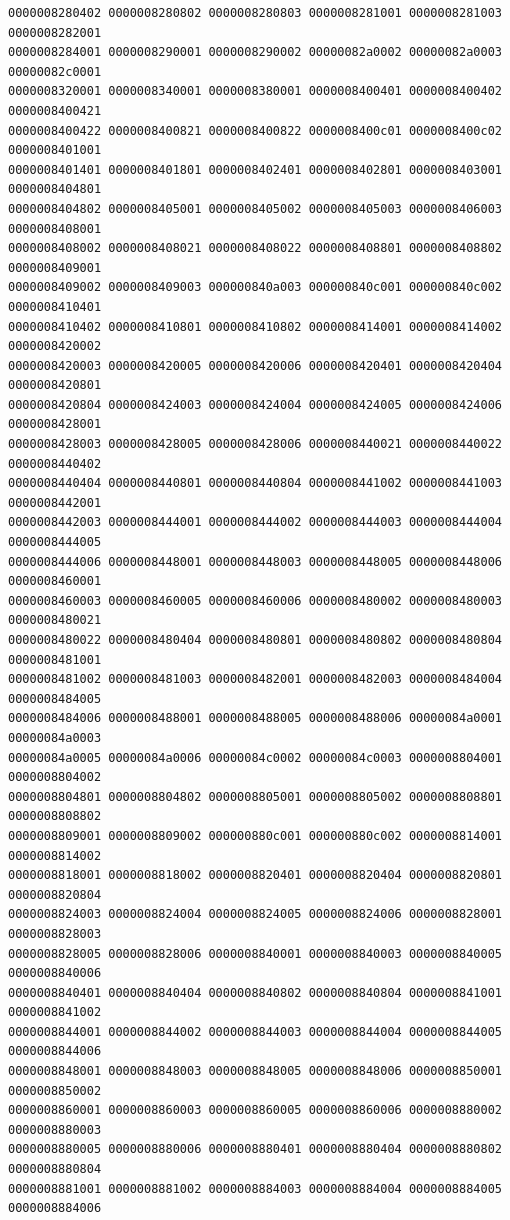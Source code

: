 \begin{Verbatim}[fontsize=\scriptsize]
0000008280402 0000008280802 0000008280803 0000008281001 0000008281003 0000008282001
0000008284001 0000008290001 0000008290002 00000082a0002 00000082a0003 00000082c0001
0000008320001 0000008340001 0000008380001 0000008400401 0000008400402 0000008400421
0000008400422 0000008400821 0000008400822 0000008400c01 0000008400c02 0000008401001
0000008401401 0000008401801 0000008402401 0000008402801 0000008403001 0000008404801
0000008404802 0000008405001 0000008405002 0000008405003 0000008406003 0000008408001
0000008408002 0000008408021 0000008408022 0000008408801 0000008408802 0000008409001
0000008409002 0000008409003 000000840a003 000000840c001 000000840c002 0000008410401
0000008410402 0000008410801 0000008410802 0000008414001 0000008414002 0000008420002
0000008420003 0000008420005 0000008420006 0000008420401 0000008420404 0000008420801
0000008420804 0000008424003 0000008424004 0000008424005 0000008424006 0000008428001
0000008428003 0000008428005 0000008428006 0000008440021 0000008440022 0000008440402
0000008440404 0000008440801 0000008440804 0000008441002 0000008441003 0000008442001
0000008442003 0000008444001 0000008444002 0000008444003 0000008444004 0000008444005
0000008444006 0000008448001 0000008448003 0000008448005 0000008448006 0000008460001
0000008460003 0000008460005 0000008460006 0000008480002 0000008480003 0000008480021
0000008480022 0000008480404 0000008480801 0000008480802 0000008480804 0000008481001
0000008481002 0000008481003 0000008482001 0000008482003 0000008484004 0000008484005
0000008484006 0000008488001 0000008488005 0000008488006 00000084a0001 00000084a0003
00000084a0005 00000084a0006 00000084c0002 00000084c0003 0000008804001 0000008804002
0000008804801 0000008804802 0000008805001 0000008805002 0000008808801 0000008808802
0000008809001 0000008809002 000000880c001 000000880c002 0000008814001 0000008814002
0000008818001 0000008818002 0000008820401 0000008820404 0000008820801 0000008820804
0000008824003 0000008824004 0000008824005 0000008824006 0000008828001 0000008828003
0000008828005 0000008828006 0000008840001 0000008840003 0000008840005 0000008840006
0000008840401 0000008840404 0000008840802 0000008840804 0000008841001 0000008841002
0000008844001 0000008844002 0000008844003 0000008844004 0000008844005 0000008844006
0000008848001 0000008848003 0000008848005 0000008848006 0000008850001 0000008850002
0000008860001 0000008860003 0000008860005 0000008860006 0000008880002 0000008880003
0000008880005 0000008880006 0000008880401 0000008880404 0000008880802 0000008880804
0000008881001 0000008881002 0000008884003 0000008884004 0000008884005 0000008884006

\end{Verbatim}
